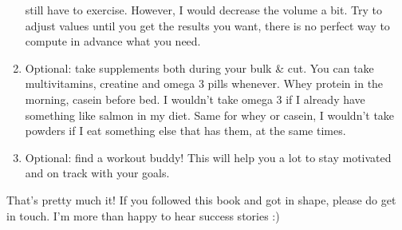 \documentclass[openany, 12pt]{book}
\begin{document}
\begin{enumerate}
                  still have to exercise. However, I would decrease the volume a bit. Try to adjust values until you get the results you want, there is no perfect way to compute in advance what you need.
                \item Optional: take supplements both during your bulk \& cut. You can take multivitamins, creatine and omega 3 pills whenever. Whey protein in the morning, casein before bed. I wouldn't
                  take omega 3 if I already have something like salmon in my diet. Same for whey or casein, I wouldn't take powders if I eat something else that has them, at the same times.
                \item Optional: find a workout buddy! This will help you a lot to stay motivated and on track with your goals.
        \end{enumerate}

        That's pretty much it! If you followed this book and got in shape, please do get in touch. I'm more than happy to hear success stories :)
\end{document}
